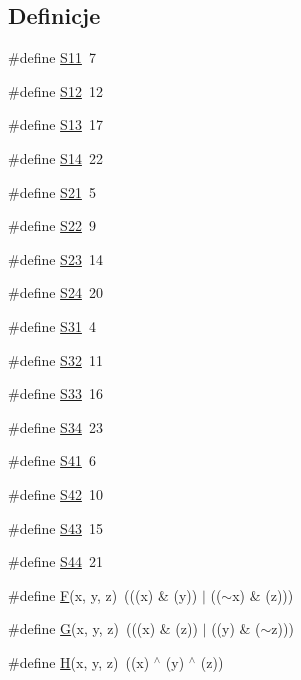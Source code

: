 \subsection*{Definicje}
\begin{CompactItemize}
\item 
\#define \hyperlink{a00010_51398c0e5541164ad4d6615880073305}{S11}~7
\item 
\#define \hyperlink{a00010_1ec499cd0e54ecc28c2ac2afea5b038e}{S12}~12
\item 
\#define \hyperlink{a00010_aeec90429105fb54d853dd4fc7027a54}{S13}~17
\item 
\#define \hyperlink{a00010_78342b0ccde2ed12fdf19a113cc266cf}{S14}~22
\item 
\#define \hyperlink{a00010_b6d5354f647a0e7592a1f051fc8377b2}{S21}~5
\item 
\#define \hyperlink{a00010_ddad30455da936bc1879ee9c72b46d59}{S22}~9
\item 
\#define \hyperlink{a00010_6321a8b29628936f76e9e78cf5bda95f}{S23}~14
\item 
\#define \hyperlink{a00010_0c09eb77d30a0d5f9154914147b86c20}{S24}~20
\item 
\#define \hyperlink{a00010_ef26590f8a880ee6f4a158168defcd89}{S31}~4
\item 
\#define \hyperlink{a00010_1d512424dd8a91e0a5bcc98563f33914}{S32}~11
\item 
\#define \hyperlink{a00010_1c854214533f6220e859b0063196abb3}{S33}~16
\item 
\#define \hyperlink{a00010_f6472be1d535970afee8e5266a74aa07}{S34}~23
\item 
\#define \hyperlink{a00010_b674ba129e588da55d1d494e1cf3c15e}{S41}~6
\item 
\#define \hyperlink{a00010_268ef1a49114a94b931cc6b313e3cd1b}{S42}~10
\item 
\#define \hyperlink{a00010_5aaa7121f39650d472746942ca68f959}{S43}~15
\item 
\#define \hyperlink{a00010_6a3989af72b55d169bd73a66f8620aae}{S44}~21
\item 
\#define \hyperlink{a00010_96d73bbd7af15cb1fc38c3f4a3bd82e9}{F}(x, y, z)~(((x) \& (y)) $|$ (($\sim$x) \& (z)))
\item 
\#define \hyperlink{a00010_d96b7cf3182ce2ba85e5a7a93b12c441}{G}(x, y, z)~(((x) \& (z)) $|$ ((y) \& ($\sim$z)))
\item 
\#define \hyperlink{a00010_e42219072d798876e6b08e6b78614ff6}{H}(x, y, z)~((x) $^\wedge$ (y) $^\wedge$ (z))
\item 

\end{CompactItemize}
